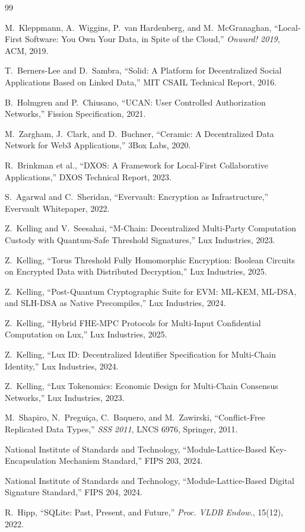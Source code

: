 \documentclass[11pt,a4paper]{article}
\begin{document}

\begin{thebibliography}{99}

M.~Kleppmann, A.~Wiggins, P.~van Hardenberg, and M.~McGranaghan,
``Local-First Software: You Own Your Data, in Spite of the Cloud,''
\textit{Onward! 2019}, ACM, 2019.

T.~Berners-Lee and D.~Sambra,
``Solid: A Platform for Decentralized Social Applications Based on Linked Data,''
MIT CSAIL Technical Report, 2016.

B.~Holmgren and P.~Chiusano,
``UCAN: User Controlled Authorization Networks,''
Fission Specification, 2021.

M.~Zargham, J.~Clark, and D.~Buchner,
``Ceramic: A Decentralized Data Network for Web3 Applications,''
3Box Labs, 2020.

R.~Brinkman et al.,
``DXOS: A Framework for Local-First Collaborative Applications,''
DXOS Technical Report, 2023.

S.~Agarwal and C.~Sheridan,
``Evervault: Encryption as Infrastructure,''
Evervault Whitepaper, 2022.

Z.~Kelling and V.~Seesahai,
``M-Chain: Decentralized Multi-Party Computation Custody with Quantum-Safe Threshold Signatures,''
Lux Industries, 2023.

Z.~Kelling,
``Torus Threshold Fully Homomorphic Encryption: Boolean Circuits on Encrypted Data with Distributed Decryption,''
Lux Industries, 2025.

Z.~Kelling,
``Post-Quantum Cryptographic Suite for EVM: ML-KEM, ML-DSA, and SLH-DSA as Native Precompiles,''
Lux Industries, 2024.

Z.~Kelling,
``Hybrid FHE-MPC Protocols for Multi-Input Confidential Computation on Lux,''
Lux Industries, 2025.

Z.~Kelling,
``Lux ID: Decentralized Identifier Specification for Multi-Chain Identity,''
Lux Industries, 2024.

Z.~Kelling,
``Lux Tokenomics: Economic Design for Multi-Chain Consensus Networks,''
Lux Industries, 2023.

M.~Shapiro, N.~Pregui\c{c}a, C.~Baquero, and M.~Zawirski,
``Conflict-Free Replicated Data Types,''
\textit{SSS 2011}, LNCS 6976, Springer, 2011.

{National Institute of Standards and Technology},
``Module-Lattice-Based Key-Encapsulation Mechanism Standard,''
FIPS 203, 2024.

{National Institute of Standards and Technology},
``Module-Lattice-Based Digital Signature Standard,''
FIPS 204, 2024.

R.~Hipp,
``SQLite: Past, Present, and Future,''
\textit{Proc. VLDB Endow.}, 15(12), 2022.

\end{thebibliography}
\end{document}
